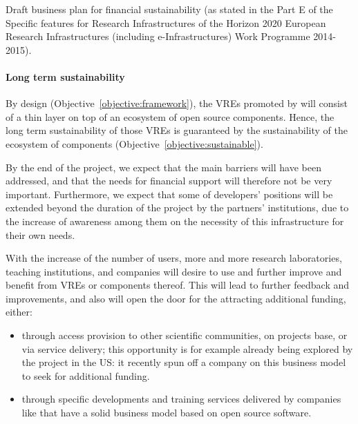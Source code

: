 
Draft business plan for financial sustainability (as stated in the Part
E of the Specific features for Research Infrastructures of the Horizon
2020 European Research Infrastructures (including e-Infrastructures)
Work Programme 2014-2015).

\paragraph{Long term sustainability}

By design (Objective~\ref{objective:framework}), the VREs promoted by
\TheProject will consist of a thin layer on top of an ecosystem of open source
components. Hence, the long term
sustainability of those VREs is guaranteed by the sustainability of the
ecosystem of components (Objective~\ref{objective:sustainable}).

By the end of the project, we expect that the main barriers will have
been addressed, and that the needs for financial support will
therefore not be very important. Furthermore, we expect that some of
developers' positions will be extended beyond the duration of the project 
by the partners' institutions, due to the increase of awareness among them 
on the necessity of this infrastructure for their own needs.

With the increase of the number of users, more and more research
laboratories, teaching institutions, and companies will desire to
use and further improve and benefit from \TheProject VREs or components
thereof. This will lead to further feedback and improvements, and also
will open the door for the attracting additional funding, either:
\begin{itemize}
\item through access provision to other scientific communities, on
  projects base, or via service delivery; this opportunity is for
  example already being explored by the \SMC project in the US: it
  recently spun off a company on this business model to seek for
  additional funding.
\item through specific developments and training services delivered by
  companies like  that have a solid business model based on
  open source software.
\end{itemize}

